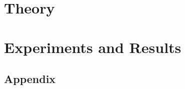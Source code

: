 \documentclass[a4paper, twoside]{report}
\begin{document}
\large




\thispagestyle{empty}

\thispagestyle{empty}

\thispagestyle{empty}

\tableofcontents
\thispagestyle{empty}
\newpage
\setcounter{page}{1}


\part{Theory}

\part{Experiments and Results}




\clearpage
{}
\renewcommand{\bibname}{References}
\printbibliography\newpage
\clearpage
{}
\appendix
\renewcommand{\thechapter}{}
\renewcommand{\thesection}{\Alph{section}}
\renewcommand{\thesubsection}{\thesection.\arabic{subsection}}
\renewcommand{\thefigure}{\thesection.\arabic{figure}}
\renewcommand{\thetable}{\thesection.\arabic{table}}
\renewcommand{\theequation}{\thesection.\arabic{equation}}
\chapter*{Appendix}

\end{document}
